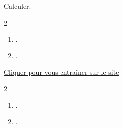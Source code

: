 \begin{exercice*}
    Calculer.
    \begin{multicols}2
        \begin{enumerate}
            \item .
            \item .
        \end{enumerate}
    \end{multicols}

    \href{.}{Cliquer pour vous entraîner sur le site \mathaleaLogo} 


\end{exercice*}
\begin{corrige}
    \phantom{rrr}    
    \begin{multicols}2
        \begin{enumerate}
            \item .
            \item .
        \end{enumerate}
    \end{multicols}
\end{corrige}

